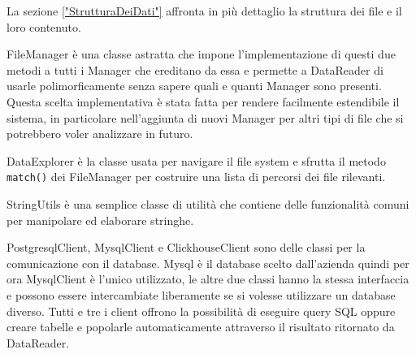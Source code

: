 La sezione \ref{"StrutturaDeiDati"} affronta in più dettaglio la struttura dei file e il loro contenuto.

FileManager è una classe astratta che impone l'implementazione di questi due metodi a tutti i Manager che ereditano da essa e permette a DataReader di usarle polimorficamente senza sapere quali e quanti Manager sono presenti. Questa scelta implementativa è stata fatta per rendere facilmente estendibile il sistema, in particolare nell'aggiunta di nuovi Manager per altri tipi di file che si potrebbero voler analizzare in futuro.

DataExplorer è la classe usata per navigare il file system e sfrutta il metodo \texttt{match()} dei FileManager per costruire una lista di percorsi dei file rilevanti.

StringUtils è una semplice classe di utilità che contiene delle funzionalità comuni per manipolare ed elaborare stringhe.

PostgresqlClient, MysqlClient e ClickhouseClient sono delle classi per la comunicazione con il database. Mysql è il database scelto dall'azienda quindi per ora MysqlClient è l'unico utilizzato, le altre due classi hanno la stessa interfaccia e possono essere intercambiate liberamente se si volesse utilizzare un database diverso.
Tutti e tre i client offrono la possibilità di eseguire query SQL oppure creare tabelle e popolarle automaticamente attraverso il risultato ritornato da DataReader.



